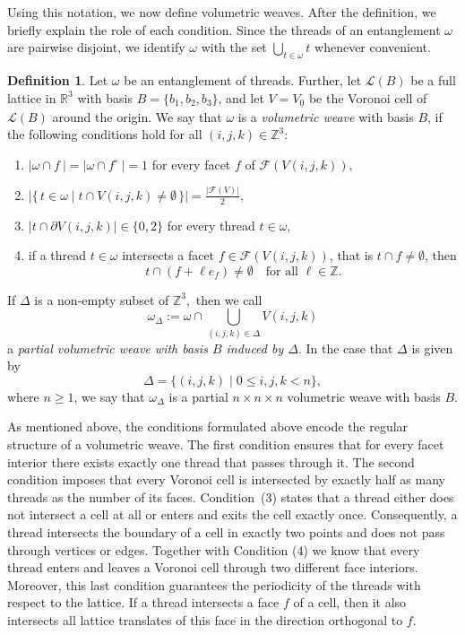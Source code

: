 \documentclass[12pt]{article}
\theoremstyle{definition}
\newtheorem{definition}[theorem]{Definition}
\theoremstyle{remark}
\begin{document}
Using this notation, we now define volumetric weaves. After the definition, we briefly explain the role of each condition. Since the threads of an entanglement $\omega$ are pairwise disjoint, we identify $\omega$ with the set $\bigcup_{t\in \omega}t$ whenever convenient.

\begin{definition}\label{def:weave}
Let $\omega$ be an entanglement of threads. Further, let $\mathcal{L}(B)$ be a full lattice in $\mathbb{R}^3$ with basis $B=\{b_1,b_2,b_3\}$, and let $V=V_{\underline{0}}$ be the Voronoi cell of $\mathcal{L}(B)$ around the origin.
We say that $\omega$ is a \emph{volumetric weave} with basis $B$, if the following conditions hold for all $(i,j,k)\in \mathbb{Z}^3$:
\begin{enumerate}
\item $\vert \omega\cap f\ \vert=\vert \omega\cap f^\circ\ \vert=1$ for every facet $f$ of $\mathcal{F}(V(i,j,k)),$
\item
$\bigl\vert \{\, t\in \omega \mid t\cap V(i,j,k)\neq\emptyset \,\}\bigr\vert =\frac{\vert \mathcal{F}(V)\vert }{2},$

\item $\vert t\cap\partial V(i,j,k)\vert\in\{0,2\}$ for every thread $t\in\omega$,


\item
if a thread $t\in\omega$ intersects a facet $f\in \mathcal{F}(V(i,j,k))$, that is $t\cap f\neq \emptyset$, then
\[
t\cap (f + \ell e_f)\neq \emptyset
\quad \text{for all } \ell\in\mathbb{Z}.
\]
\end{enumerate}
If $\Delta$ is a non-empty subset of $\mathbb{Z}^3,$ then we call $$\omega_{\Delta}:=\omega \cap \bigcup_{(i,j,k)\in {\Delta}}V(i,j,k)$$ a \emph{partial volumetric weave with basis $B$ induced by $\Delta$}. In the case that $\Delta$ is given by $$\Delta=\{(i,j,k)\mid 0\leq i,j,k<n \},$$ where $n\geq 1$, we say that $\omega_{\Delta}$ is a partial $n{\times} n{\times} n$ volumetric weave with basis $B$.
\end{definition}


As mentioned above, the conditions formulated above encode the regular structure of a volumetric weave.
The first condition ensures that for every facet interior there exists exactly one thread that passes through it.
The second condition imposes that
every Voronoi cell is intersected by exactly half as many threads as the number of its faces.
Condition~(3) states that a thread either does not intersect a cell at all or enters and exits the cell exactly once.  Consequently, a thread intersects the boundary of a cell in exactly two points and does not pass through vertices or edges. Together with Condition (4) we know that every thread enters and leaves a Voronoi cell through two different face interiors. Moreover, this last condition guarantees the periodicity of the threads with respect to the lattice. If a thread intersects a face $f$ of a cell, then it also intersects all lattice translates of this face in the direction orthogonal to $f$.
\end{document}
